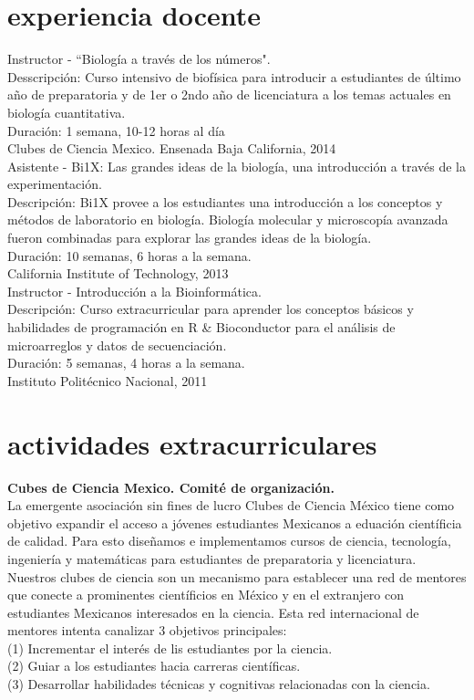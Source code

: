 \documentclass[]{friggeri-cv}
\begin{document}
\section{experiencia docente}
Instructor - ``Biolog\'ia a trav\'es de los n\'umeros".\\
Desscripci\'on: Curso intensivo de biof\'isica para introducir a estudiantes de \'ultimo a\~no de preparatoria y de 1er o 2ndo a\~no de licenciatura a los temas actuales en biolog\'ia cuantitativa.\\
Duraci\'on: 1 semana, 10-12 horas al d\'ia\\
{Clubes de Ciencia Mexico. Ensenada Baja California, 2014}\\

Asistente - Bi1X: Las grandes ideas de la biolog\'ia, una introducci\'on a trav\'es de la experimentaci\'on.\\
Descripci\'on: Bi1X provee a los estudiantes una introducci\'on a los conceptos y m\'etodos de laboratorio en biolog\'ia. Biolog\'ia molecular y microscop\'ia avanzada fueron combinadas para explorar las grandes ideas de la biolog\'ia.\\
Duraci\'on: 10 semanas, 6 horas a la semana.\\
{California Institute of Technology, 2013}\\

Instructor - Introducci\'on a la Bioinform\'atica.\\
Descripci\'on: Curso extracurricular para aprender los conceptos b\'asicos y habilidades de programaci\'on en R \& Bioconductor para el an\'alisis de microarreglos y datos de secuenciaci\'on.\\
Duraci\'on: 5 semanas, 4 horas a la semana.\\
{Instituto Polit\'ecnico Nacional, 2011}\\


\section{actividades extracurriculares}
\textbf{Cubes de Ciencia Mexico. Comit\'e de organizaci\'on.}\\
La emergente asociaci\'on sin fines de lucro Clubes de Ciencia M\'exico tiene como objetivo expandir el acceso a j\'ovenes estudiantes Mexicanos a eduaci\'on cient\'ificia de calidad. Para esto dise\~namos e implementamos cursos de ciencia, tecnolog\'ia, ingenier\'ia y matem\'aticas para estudiantes de preparatoria y licenciatura. Nuestros clubes de ciencia son un mecanismo para establecer una red de mentores que conecte a prominentes cient\'ificios en M\'exico y en el extranjero con estudiantes Mexicanos interesados en la ciencia. Esta red internacional de mentores intenta canalizar 3 objetivos principales:\\
(1) Incrementar el inter\'es de lis estudiantes por la ciencia.\\
(2) Guiar a los estudiantes hacia carreras cient\'ificas.\\
(3) Desarrollar habilidades t\'ecnicas y cognitivas relacionadas con la ciencia.
\end{document}
